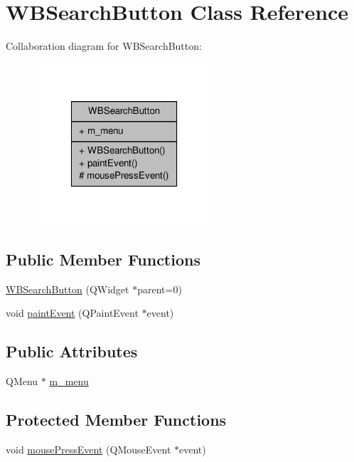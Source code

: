 \hypertarget{class_w_b_search_button}{\section{W\-B\-Search\-Button Class Reference}
\label{d9/dc5/class_w_b_search_button}
}


Collaboration diagram for W\-B\-Search\-Button\-:
\nopagebreak
\begin{figure}[H]
\begin{center}
\leavevmode
\includegraphics[width=190pt]{da/d09/class_w_b_search_button__coll__graph}
\end{center}
\end{figure}
\subsection*{Public Member Functions}
\begin{DoxyCompactItemize}
\item 
\hyperlink{class_w_b_search_button_ac3e9a8ec44e2a7301af9413f47ba498f}{W\-B\-Search\-Button} (Q\-Widget $\ast$parent=0)
\item 
void \hyperlink{class_w_b_search_button_a3f6d3b118ddfb20b9e87fda62826434c}{paint\-Event} (Q\-Paint\-Event $\ast$event)
\end{DoxyCompactItemize}
\subsection*{Public Attributes}
\begin{DoxyCompactItemize}
\item 
Q\-Menu $\ast$ \hyperlink{class_w_b_search_button_a3d610346151c630dd93c4fcdd1f1fe38}{m\-\_\-menu}
\end{DoxyCompactItemize}
\subsection*{Protected Member Functions}
\begin{DoxyCompactItemize}
\item 
void \hyperlink{class_w_b_search_button_aa742d2d22eabfa2a1ab781161c36f535}{mouse\-Press\-Event} (Q\-Mouse\-Event $\ast$event)
\end{DoxyCompactItemize}


